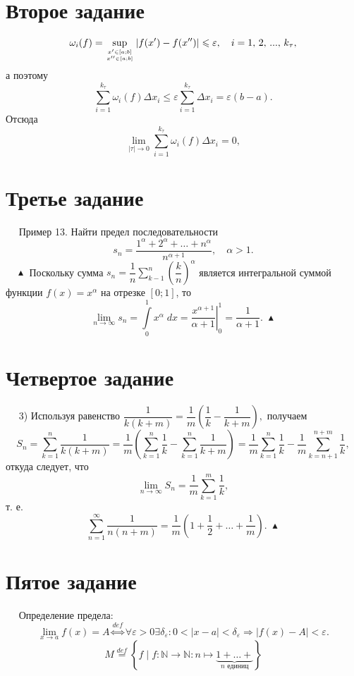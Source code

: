 \documentclass[a4paper,12pt]{article} %
\begin{document}
	\section{Второе задание}
	$$
		\omega_i(f) = \sup \limits_{x' \in \left[a ; b\right] \atop x'' \in \left[a ; b\right]} |f(x') -f(x'')| \leqslant \varepsilon, \quad
		i=1,\, 2, \, ... , \, k_\tau,
	$$
	а поэтому
	$$
		\sum \limits_{i=1}^{k_\tau} \omega_i(f) \Delta x_i \leqslant \varepsilon 
		\sum \limits_{i=1}^{k_\tau} \Delta x_i = 
		\varepsilon \left(b - a\right).
	$$
	Отсюда
	$$
		\lim \limits_{| \tau | \to 0} \sum \limits_{i=1}^{k_\tau} \omega_i(f) \Delta x_i = 0,
	$$
	
	\section{Третье задание}
	$\quad$ Пример 13. Найти предел последовательности 
	$$
		s_n = \dfrac{1^{\alpha} + 2^{\alpha} + \dots + n^{\alpha}}{n^{\alpha + 1}}, \quad \alpha > 1.
	$$
	$\quad \blacktriangle$ Поскольку сумма $s_n \! = \dfrac{1}{n} \displaystyle \sum \limits_{k-1}^n \left( \dfrac{k}{n} \right)^ \alpha$ является интегральной суммой функции
	$f(x) = x^{\alpha}$ на отрезке $\left[0; 1\right]$, то
	$$
		\lim \limits_{n \to \infty} s_n = 
		\int \limits_0^1 x^{\alpha} \; dx = 
		\left. \dfrac{x^{\alpha + 1}}{\alpha + 1} \right|_0^1 =
		\dfrac{1}{\alpha + 1}. \; \blacktriangle
	$$
	
	\section{Четвертое задание}
	$\quad$ 3) Используя равенство
	$
		\dfrac{1}{k \left(k + m\right)} = \dfrac{1}{m}
		\left( \dfrac{1}{k} - \dfrac{1}{k + m} \right) \! ,
	$
	получаем
	$$
		S_n = \sum \limits_{k = 1}^n \dfrac{1}{k \left(k + m\right)} = 
		\dfrac{1}{m} \left( \sum \limits_{k=1}^n \dfrac{1}{k} - \sum \limits_{k=1}^n \dfrac{1}{k + m} \right) = 
		\dfrac{1}{m} \sum \limits_{k = 1}^n \dfrac{1}{k} -
		\dfrac{1}{m} \sum \limits_{k = n + 1}^{n + m} \dfrac{1}{k},
	$$
	откуда следует, что
	$$
		\lim \limits_{n \to \infty} S_n = \dfrac{1}{m} \sum \limits_{k=1}^m \dfrac{1}{k},
	$$
	т. е.
	$$
		\sum \limits_{n = 1}^{\infty} \dfrac{1}{n \left(n + m\right)} =
		\dfrac{1}{m} \left(1 + \dfrac{1}{2} + \dots + \dfrac{1}{m} \right) \! . \; \blacktriangle
	$$
	
	\section{Пятое задание}
	$\quad$ Определение предела:
	$$
		\lim \limits_{x \to a} f(x) = A \stackrel{def}{\Longleftrightarrow}
		\forall \varepsilon > 0 \exists \delta_{\varepsilon} : 
		0 < |x - a| < \delta_{\varepsilon} \Longrightarrow 
		| f(x) - A | < \varepsilon.
	$$
	$$
		M \stackrel{def}{=} \left\{ f \mid f : \mathbb{N} \to \mathbb{N} : n \longmapsto \underbrace{1 + \dots + }_{n \text{ единиц}} \right\}
	$$
\end{document}

